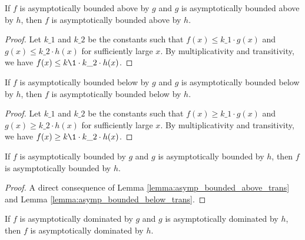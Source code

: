 \begin{lemma}
    \label{lemma:asymp_bounded_above_trans}
    \leanok
    If $f$ is asymptotically bounded above by $g$ and $g$ is asymptotically bounded above
    by $h$, then $f$ is asymptotically bounded above by $h$.
\end{lemma}

\begin{proof}
    \leanok
    Let $k\_1$ and $k\_2$ be the constants such that $f(x) \le k\_1 \cdot g(x)$ and
    $g(x) \le k\_2 \cdot h(x)$ for sufficiently large $x$. By multiplicativity and 
    transitivity, we have $f(x) \le k\1 \cdot k\_2 \cdot h(x)$.
\end{proof}

\begin{lemma}
    \label{lemma:asymp_bounded_below_trans}
    \leanok
    If $f$ is asymptotically bounded below by $g$ and $g$ is asymptotically bounded below
    by $h$, then $f$ is asymptotically bounded below by $h$.
\end{lemma}

\begin{proof}
    \leanok
    Let $k\_1$ and $k\_2$ be the constants such that $f(x) \ge k\_1 \cdot g(x)$ and
    $g(x) \ge k\_2 \cdot h(x)$ for sufficiently large $x$. By multiplicativity and 
    transitivity, we have $f(x) \ge k\1 \cdot k\_2 \cdot h(x)$.
\end{proof}

\begin{lemma}
    \label{lemma:asymp_bounded_trans}
    \leanok
    If $f$ is asymptotically bounded by $g$ and $g$ is asymptotically bounded 
    by $h$, then $f$ is asymptotically bounded by $h$.
\end{lemma}

\begin{proof}
    \leanok
    A direct consequence of Lemma \ref{lemma:asymp_bounded_above_trans} and Lemma
    \ref{lemma:asymp_bounded_below_trans}.
\end{proof}

\begin{lemma}
    \label{lemma:asymp_right_dom_trans}
    \leanok
    If $f$ is asymptotically dominated by $g$ and $g$ is asymptotically dominated by $h$, then 
    $f$ is asymptotically dominated by $h$.
\end{lemma}

